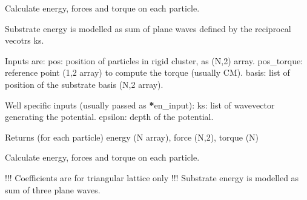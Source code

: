 \documentclass[letterpaper,10pt,english]{sphinxmanual}
\begin{document}
\begin{fulllineitems}
\label{\detokenize{tool_create_substrate:tool_create_substrate.particle_en_sin}}
\pysigstartsignatures
{}
\pysigstopsignatures
\sphinxAtStartPar
Calculate energy, forces and torque on each particle.

\sphinxAtStartPar
Substrate energy is modelled as sum of plane waves defined by the reciprocal vecotrs ks.

\sphinxAtStartPar
Inputs are:
\sphinxhyphen{} pos: position of particles in rigid cluster, as (N,2) array.
\sphinxhyphen{} pos\_torque: reference point (1,2 array) to compute the torque (usually CM).
\sphinxhyphen{} basis: list of position of the substrate basis (N,2 array).

\sphinxAtStartPar
Well specific inputs (usually passed as {\color{red}\bfseries{}*}en\_input):
\sphinxhyphen{} ks: list of wavevector generating the potential.
\sphinxhyphen{} epsilon: depth of the potential.

\sphinxAtStartPar
Returns (for each particle) energy (N array), force (N,2), torque (N)

\end{fulllineitems}


\begin{fulllineitems}
\label{\detokenize{tool_create_substrate:tool_create_substrate.particle_en_sin_tri}}
\pysigstartsignatures
{}
\pysigstopsignatures
\sphinxAtStartPar
Calculate energy, forces and torque on each particle.

\sphinxAtStartPar
!!! Coefficients are for triangular lattice only !!!
Substrate energy is modelled as sum of three plane waves.

\end{fulllineitems}
\end{document}
